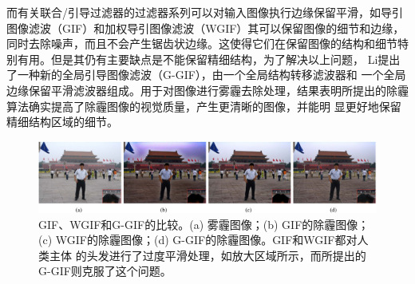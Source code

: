 而有关联合/引导过滤器的过滤器系列可以对输入图像执行边缘保留平滑，如导引图像滤波（GIF）和加权导引图像滤波（WGIF）其可以保留图像的细节和边缘，
同时去除噪声，而且不会产生锯齿状边缘。这使得它们在保留图像的结构和细节特别有用。但是其仍有主要缺点是不能保留精细结构，为了解决以上问题，
Li提出了一种新的全局引导图像滤波（G-GIF）\cite{SingleImageDeHazingUsingGloballyGuidedImageFiltering2018}，由一个全局结构转移滤波器和
一个全局边缘保留平滑滤波器组成。用于对图像进行雾霾去除处理，结果表明所提出的除霾算法确实提高了除霾图像的视觉质量，产生更清晰的图像，并能明
显更好地保留精细结构区域的细节。

\begin{figure}[htbp]
	\begin{center}
	    \vspace{10pt} %
		\includegraphics[width = 1\textwidth]{images/05.eps}
		\caption{GIF、WGIF和G-GIF的比较。(a) 雾霾图像；(b) GIF的除霾图像；(c) WGIF的除霾图像；(d) G-GIF的除霾图像。GIF和WGIF都对人类主体
        的头发进行了过度平滑处理，如放大区域所示，而所提出的G-GIF则克服了这个问题。} 
		\label{05} %
	\end{center}
\end{figure}


